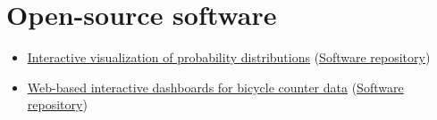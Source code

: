 \documentclass[11pt]{article}
\newenvironment{main}
{\begin{adjustwidth}{3em}{}}
{\end{adjustwidth}}
\begin{document}
\section*{Open-source software}
\begin{main}

\begin{itemize}
    \item \href{https://probstats.org/}{Interactive visualization of probability distributions} (\href{https://github.com/probstats/probstats.github.io}{Software repository})
    \item \href{https://bikecounter.org/}{Web-based interactive dashboards for bicycle counter data} (\href{https://github.com/fenggroup/bike-traffic-plotly-dash}{Software repository})
\end{itemize}

\end{main}
\end{document}
